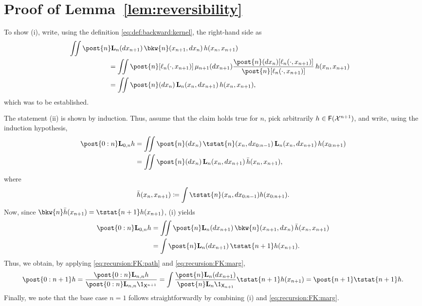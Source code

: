\section{Proof of Lemma~\ref{lem:reversibility}}
\label{sec:proof:lem:reversibility}

To show (i), write, using the definition \eqref{eq:def:backward:kernel}, the right-hand side as 
\begin{align*}
\lefteqn{\iint \post{n} \uk{n}(\rmd x_{n + 1}) \, \bkw{n}(x_{n + 1}, \rmd x_n) \, h(x_n, x_{n + 1})} \hspace{20mm} \\
&= \iint \post{n}[\ud{n}(\cdot, x_{n + 1})] \, \mu_{n + 1}(\rmd x_{n + 1}) \frac{\post{n}(\rmd x_n) [\ud{n}(\cdot, x_{n + 1})]}{\post{n}[\ud{n}(\cdot, x_{n + 1})]} \, h(x_n, x_{n + 1}) \\
&= \iint \post{n}(\rmd x_n) \, \uk{n}(x_n, \rmd x_{n + 1}) \, h(x_n, x_{n + 1}), 
\end{align*}
which was to be established. 

The statement (ii) is shown by induction. Thus, assume that the claim holds true for $n$, pick arbitrarily $h \in \mathsf{F}(\mathcal{X}^{n + 1})$, and write, using the induction hypothesis, 
\begin{align*}
\post{0:n} \uk{0, n} h &= \iint \post{n}(\rmd x_n) \, \tstat{n}(x_n, \rmd x_{0:n - 1}) \, \uk{n}(x_n, \rmd x_{n + 1}) \, h(x_{0:n + 1}) \\
&= \iint \post{n}(\rmd x_n) \, \uk{n}(x_n, \rmd x_{n + 1}) \, \bar{h}(x_n, x_{n + 1}), 
\end{align*}
where 
$$
\bar{h}(x_n, x_{n + 1}) \eqdef \int \tstat{n}(x_n, \rmd x_{0:n - 1}) h(x_{0:n + 1}). 
$$
Now, since $\bkw{n} \bar{h}(x_{n + 1}) = \tstat{n + 1} h(x_{n + 1})$, (i) yields
\begin{align*} 
\post{0:n} \uk{0, n} h 
&= \iint \post{n} \uk{n}(\rmd x_{n + 1}) \, \bkw{n}(x_{n + 1}, \rmd x_n) \, \bar{h}(x_n, x_{n + 1}) \\
&= \int \post{n} \uk{n}(\rmd x_{n + 1}) \, \tstat{n + 1} h(x_{n + 1}). 
\end{align*}
Thus, we obtain, by applying \eqref{eq:recursion:FK:path} and \eqref{eq:recursion:FK:marg},  
$$
\post{0:n + 1} h = \frac{\post{0:n} \uk{n, n} h}{\post{0:n} \uk{n, n} \1_{\Xset^{n+1}}} 
= \int \frac{\post{n} \uk{n}(\rmd x_{n + 1})}{\post{n} \uk{n} \1_{\Xset_{n + 1}}} \tstat{n + 1} h(x_{n + 1}) = \post{n + 1} \tstat{n + 1} h. 
$$
Finally, we note that the base case $n = 1$ follows straightforwardly by combining (i) and \eqref{eq:recursion:FK:marg}. 
